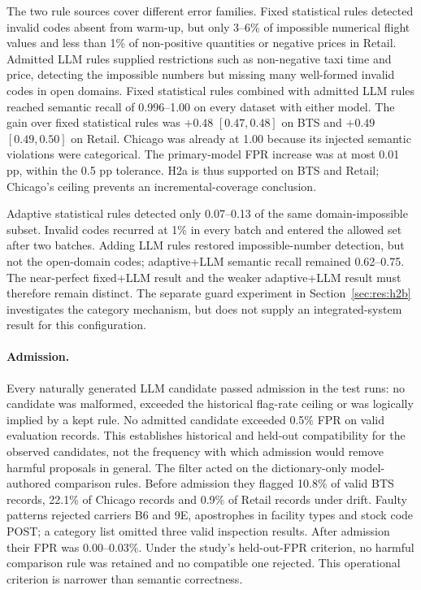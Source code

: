 The two rule sources cover different error families. Fixed statistical rules detected invalid codes absent from warm-up, but only 3--6\% of impossible numerical flight values and less than 1\% of non-positive quantities or negative prices in Retail. Admitted LLM rules supplied restrictions such as non-negative taxi time and price, detecting the impossible numbers but missing many well-formed invalid codes in open domains. Fixed statistical rules combined with admitted LLM rules reached semantic recall of 0.996--1.00 on every dataset with either model. The gain over fixed statistical rules was $+0.48$ $[0.47,0.48]$ on BTS and $+0.49$ $[0.49,0.50]$ on Retail. Chicago was already at 1.00 because its injected semantic violations were categorical. The primary-model FPR increase was at most 0.01 pp, within the 0.5 pp tolerance. H2a is thus supported on BTS and Retail; Chicago's ceiling prevents an incremental-coverage conclusion.

Adaptive statistical rules detected only 0.07--0.13 of the same domain-impossible subset. Invalid codes recurred at 1\% in every batch and entered the allowed set after two batches. Adding LLM rules restored impossible-number detection, but not the open-domain codes; adaptive+LLM semantic recall remained 0.62--0.75. The near-perfect fixed+LLM result and the weaker adaptive+LLM result must therefore remain distinct. The separate guard experiment in Section~\ref{sec:res:h2b} investigates the category mechanism, but does not supply an integrated-system result for this configuration.

\paragraph{Admission.} Every naturally generated LLM candidate passed admission in the test runs: no candidate was malformed, exceeded the historical flag-rate ceiling or was logically implied by a kept rule. No admitted candidate exceeded 0.5\% FPR on valid evaluation records. This establishes historical and held-out compatibility for the observed candidates, not the frequency with which admission would remove harmful proposals in general. The filter acted on the dictionary-only model-authored comparison rules. Before admission they flagged 10.8\% of valid BTS records, 22.1\% of Chicago records and 0.9\% of Retail records under drift. Faulty patterns rejected carriers B6 and 9E, apostrophes in facility types and stock code POST; a category list omitted three valid inspection results. After admission their FPR was 0.00--0.03\%. Under the study's held-out-FPR criterion, no harmful comparison rule was retained and no compatible one rejected. This operational criterion is narrower than semantic correctness.

